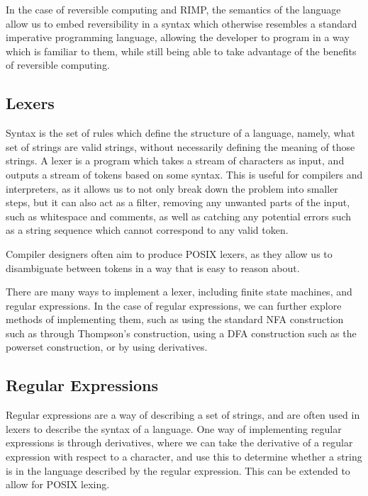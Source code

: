 In the case of reversible computing and RIMP, the semantics of the language allow us to embed reversibility in a syntax which otherwise resembles a standard imperative programming language, allowing the developer to program in a way which is familiar to them, while still being able to take advantage of the benefits of reversible computing.

\subsection*{Lexers}\label{subsec:lexers}
Syntax is the set of rules which define the structure of a language, namely, what set of strings are valid strings, without necessarily defining the meaning of those strings.
A lexer is a program which takes a stream of characters as input, and outputs a stream of tokens based on some syntax.
This is useful for compilers and interpreters, as it allows us to not only break down the problem into smaller steps, but it can also act as a filter, removing any unwanted parts of the input, such as whitespace and comments, as well as catching any potential errors such as a string sequence which cannot correspond to any valid token.

Compiler designers often aim to produce POSIX lexers, as they allow us to disambiguate between tokens in a way that is easy to reason about.

There are many ways to implement a lexer, including finite state machines, and regular expressions.
In the case of regular expressions, we can further explore methods of implementing them, such as using the standard NFA construction such as through Thompson's construction\cite{NFAConstruction}, using a DFA construction such as the powerset construction, or by using derivatives\cite{Derivatives}.

\subsection*{Regular Expressions}\label{subsec:regex}
Regular expressions are a way of describing a set of strings, and are often used in lexers to describe the syntax of a language.
One way of implementing regular expressions is through derivatives, where we can take the derivative of a regular expression with respect to a character, and use this to determine whether a string is in the language described by the regular expression.
This can be extended to allow for POSIX lexing\cite{LexingDerivatives}.

